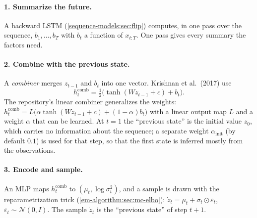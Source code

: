 \begin{notechapter}
\paragraph{1. Summarize the future.} A backward LSTM (\cref{sequence-models:sec:flip}) computes, in one
pass over the sequence, $b_1,\dots,b_T$ with $b_t$ a function of $x_{t:T}$. One pass gives every summary the factors
need.

\paragraph{2. Combine with the previous state.} A \emph{combiner} merges $z_{t-1}$ and $b_t$ into one vector.
Krishnan et al.\ (2017) use
\[
  h^{\mathrm{comb}}_t = \tfrac12\bigl(\tanh(Wz_{t-1} + c) + b_t\bigr) .
\]
The repository's linear combiner generalizes the weights:
$h^{\mathrm{comb}}_t = L\bigl(\alpha\tanh(Wz_{t-1} + c) + (1 - \alpha)b_t\bigr)$ with a linear output map $L$ and a weight $\alpha$ that can be learned.
At $t = 1$ the ``previous state'' is the initial value $z_0$, which carries no information about the
sequence; a separate weight $\alpha_{\mathrm{init}}$ (by default $0.1$) is used for that step, so that the first
state is inferred mostly from the observations.

\paragraph{3. Encode and sample.} An MLP maps $h^{\mathrm{comb}}_t$ to $(\mu_t, \log\sigma_t^2)$, and a sample is drawn with the
reparametrization trick (\cref{em-algorithm:sec:mc-elbo}):
$\dot z_t = \mu_t + \sigma_t\odot\varepsilon_t$, $\varepsilon_t\sim\mathcal N(0, I)$. The sample $\dot z_t$ is the ``previous state'' of step $t+1$.


\end{notechapter}
